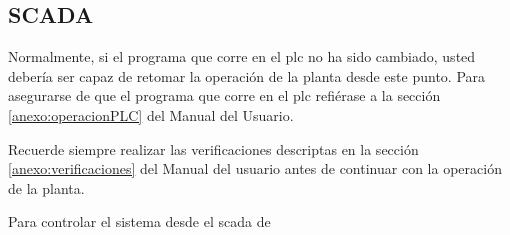 % 
% 
% 

\subsection{SCADA}
Normalmente, si el programa que corre en el \gls{plc} no ha sido cambiado, 
usted debería ser capaz de retomar la operación de la planta desde este punto. 
Para asegurarse de que el programa que corre en el \gls{plc} refiérase a la 
sección \ref{anexo:operacionPLC} del Manual del Usuario.
\begin{lattention}
 Recuerde siempre realizar las verificaciones descriptas en la sección 
\ref{anexo:verificaciones} del Manual del usuario antes de continuar con la 
operación de la planta.
\end{lattention}

Para controlar el sistema desde el \gls{scada} de 

